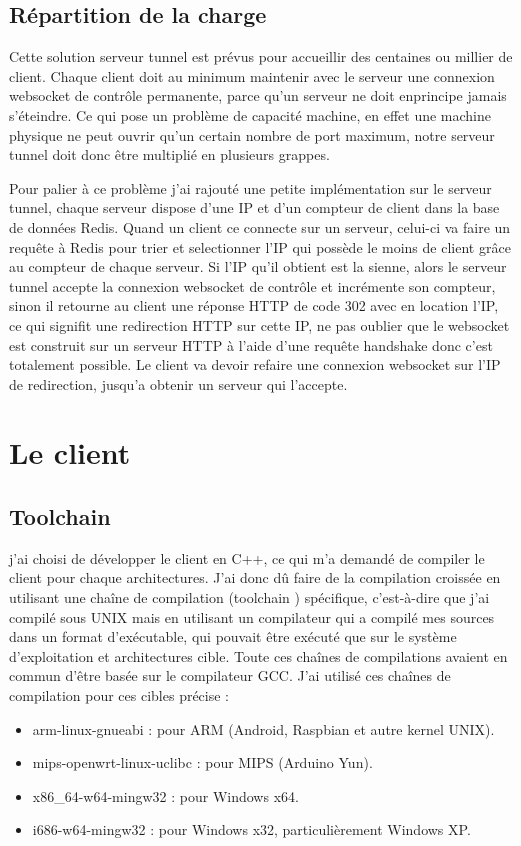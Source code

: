\subsection{Répartition de la charge}

Cette solution serveur tunnel est prévus pour accueillir des centaines ou millier de client. Chaque client doit au minimum maintenir avec le serveur une connexion websocket de contrôle permanente, parce qu'un serveur ne doit enprincipe jamais s'éteindre. Ce qui pose un problème de capacité machine, en effet une machine physique ne peut ouvrir qu'un certain nombre de port maximum, notre serveur tunnel doit donc être multiplié en plusieurs grappes.

Pour palier à ce problème j'ai rajouté une petite implémentation sur le serveur tunnel, chaque serveur dispose d'une IP et d'un compteur de client dans la base de données Redis. Quand un client ce connecte sur un serveur, celui-ci va faire un requête à Redis pour trier et selectionner l'IP qui possède le moins de client grâce au compteur de chaque serveur. Si l'IP qu'il obtient est la sienne, alors le serveur tunnel accepte la connexion websocket de contrôle et incrémente son compteur, sinon il retourne au client une réponse HTTP de code 302 avec en location l'IP, ce qui signifit une redirection HTTP sur cette IP, ne pas oublier que le websocket est construit sur un serveur HTTP à l'aide d'une requête handshake donc c'est totalement possible. Le client va devoir refaire une connexion websocket sur l'IP de redirection, jusqu'a obtenir un serveur qui l'accepte.

\section{Le client}

\subsection{Toolchain}

j'ai choisi de développer le client en C++, ce qui m'a demandé de compiler le client pour chaque architectures. J'ai donc dû faire de la compilation croissée en utilisant une chaîne de compilation (\og toolchain \fg{}) spécifique, c'est-à-dire que j'ai compilé sous UNIX mais en utilisant un compilateur qui a compilé mes sources dans un format d'exécutable, qui pouvait être exécuté que sur le système d'exploitation et architectures cible. Toute ces chaînes de compilations avaient en commun d'être basée sur le compilateur GCC. J'ai utilisé ces chaînes de compilation pour ces cibles précise :
\begin{itemize}
    \item arm-linux-gnueabi : pour ARM (Android, Raspbian et autre kernel UNIX).
    \item mips-openwrt-linux-uclibc : pour MIPS (Arduino Yun).
    \item x86\_64-w64-mingw32 : pour Windows x64.
    \item i686-w64-mingw32 : pour Windows x32, particulièrement Windows XP.
\end{itemize}

